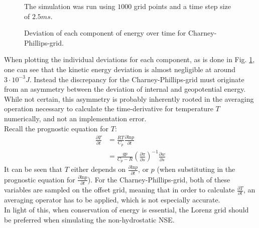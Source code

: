\begin{figure}[!h]
    \caption{Deviation of each component of energy over time for Charney-Phillips-grid.}
    \label{fig:cp_energy_split}
    \small
    The simulation was run using $1000$ grid points and a time step size of $2.5ms$.
\end{figure}
\noindent
When plotting the individual deviations for each component, as is done in Fig. \ref{fig:cp_energy_split}, one can see that the kinetic energy deviation is almost negligible at around $3\cdot10^{-3}J$.
Instead the discrepancy for the Charney-Phillips-grid must originate from an asymmetry between the deviation of internal and geopotential energy.
While not certain, this asymmetry is probably inherently rooted in the averaging operation necessary to calculate the time-derivative for temperature $T$ numerically, and not an implementation error.
\\
Recall the prognostic equation for $T$:
\begin{align*}
\frac{\partial T}{\partial t} &= \frac{RT}{C_p}\frac{\partial \text{ln}p}{\partial t}\\
&=\frac{gp}{C_p-R}\left(\frac{\partial \pi}{\partial s}\right)^{-1} \frac{\partial w}{\partial s}
\end{align*}
It can be seen that $T$ either depends on $\frac{\partial \text{ln}p}{\partial t}$, or $p$ (when substituting in the prognostic equation for $\frac{\partial \text{ln}p}{\partial t}$).
For the Charney-Phillips-grid, both of these variables are sampled on the offset grid, meaning that in order to calculate $\frac{\partial T}{\partial t}$, an averaging operator has to be applied, which is not especially accurate.\\
In light of this, when conservation of energy is essential, the Lorenz grid should be preferred when simulating the non-hydrostatic NSE.

